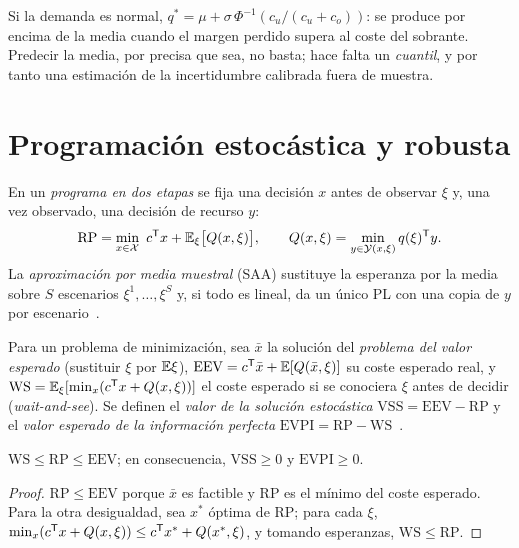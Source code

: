 Si la demanda es normal, $q^{*}=\mu+\sigma\,\Phi^{-1}(c_u/(c_u+c_o))$: se produce por encima de la media cuando el margen perdido supera al coste del sobrante. Predecir la media, por precisa que sea, no basta; hace falta un \emph{cuantil}, y por tanto una estimación de la incertidumbre calibrada fuera de muestra.

\section{Programación estocástica y robusta}

\begin{definicion}\label{def:dos-etapas}
En un \emph{programa en dos etapas} se fija una decisión $x$ antes de observar $\xi$ y, una vez observado, una decisión de recurso $y$:
\[
\mathrm{RP}=\min_{x\in\mathcal{X}}\ c^{\mathsf{T}} x+\mathbb{E}_\xi\bigl[Q(x,\xi)\bigr],\qquad Q(x,\xi)=\min_{y\in\mathcal{Y}(x,\xi)}q(\xi)^{\mathsf{T}} y .
\]
La \emph{aproximación por media muestral} (SAA) sustituye la esperanza por la media sobre $S$ escenarios $\xi^{1},\dots,\xi^{S}$ y, si todo es lineal, da un único PL con una copia de $y$ por escenario~\cite{ee364stoch}.
\end{definicion}

\begin{definicion}\label{def:vss}
Para un problema de minimización, sea $\bar x$ la solución del \emph{problema del valor esperado} (sustituir $\xi$ por $\mathbb{E}\xi$), $\mathrm{EEV}=c^{\mathsf{T}}\bar x+\mathbb{E}[Q(\bar x,\xi)]$ su coste esperado real, y $\mathrm{WS}=\mathbb{E}_\xi[\min_x(c^{\mathsf{T}} x+Q(x,\xi))]$ el coste esperado si se conociera $\xi$ antes de decidir (\emph{wait-and-see}). Se definen el \emph{valor de la solución estocástica} $\mathrm{VSS}=\mathrm{EEV}-\mathrm{RP}$ y el \emph{valor esperado de la información perfecta} $\mathrm{EVPI}=\mathrm{RP}-\mathrm{WS}$~\cite{bl}.
\end{definicion}

\begin{proposicion}\label{prop:vss}
$\mathrm{WS}\le\mathrm{RP}\le\mathrm{EEV}$; en consecuencia, $\mathrm{VSS}\ge 0$ y $\mathrm{EVPI}\ge 0$.
\end{proposicion}

\begin{proof}
$\mathrm{RP}\le\mathrm{EEV}$ porque $\bar x$ es factible y RP es el mínimo del coste esperado. Para la otra desigualdad, sea $x^{*}$ óptima de RP; para cada $\xi$, $\min_x(c^{\mathsf{T}} x+Q(x,\xi))\le c^{\mathsf{T}} x^{*}+Q(x^{*},\xi)$, y tomando esperanzas, $\mathrm{WS}\le\mathrm{RP}$.
\end{proof}

